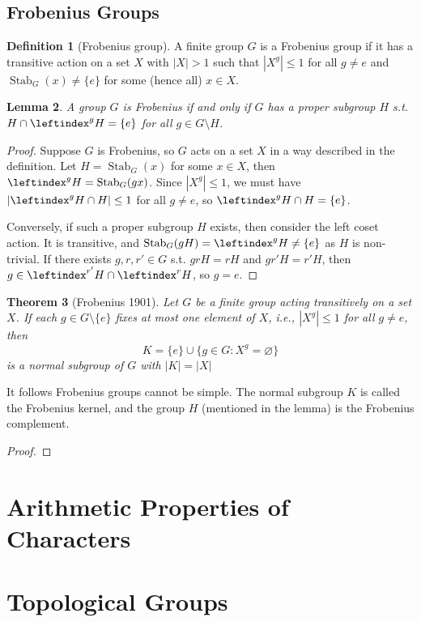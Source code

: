 \documentclass{article}
\theoremstyle{definition}
\newtheorem{defn}{Definition}[section]
\theoremstyle{remark}
\theoremstyle{plain}
\newtheorem{lem}[defn]{Lemma}
\newtheorem{thm}[defn]{Theorem}
\begin{document}
\subsection{Frobenius Groups}
\begin{defn}[Frobenius group]
    A finite group $G$ is a Frobenius group if it has a transitive action on a set $X$ with $|X|>1$ such that $|X^g|\le 1$ for all $g\neq e$ and $\operatorname{Stab}_G(x)\neq\{e\}$ for some (hence all) $x\in X$.
\end{defn}
\begin{lem}
    A group $G$ is Frobenius if and only if $G$ has a proper subgroup $H$ s.t. $H\cap\leftindex^gH=\{e\}$ for all $g\in G\setminus H$.
\end{lem}
\begin{proof}
    Suppose $G$ is Frobenius, so $G$ acts on a set $X$ in a way described in the definition. Let $H=\operatorname{Stab}_G(x)$ for some $x\in X$, then $\leftindex^gH=\operatorname{Stab}_G(gx)$. Since $|X^g|\le 1$, we must have $|\leftindex^gH\cap H|\le 1$ for all $g\neq e$, so $\leftindex^gH\cap H=\{e\}$.

    Conversely, if such a proper subgroup $H$ exists, then consider the left coset action. It is transitive, and $\operatorname{Stab}_G(gH)=\leftindex^gH\neq \{e\}$ as $H$ is non-trivial. If there exists $g,r,r'\in G$ s.t. $grH=rH$ and $gr'H=r'H$, then $g\in\leftindex^{r'}H\cap\leftindex^rH$, so $g=e$. 
\end{proof}
\begin{thm}[Frobenius 1901]
    Let $G$ be a finite group acting transitively on a set $X$. If each $g\in G\setminus\{e\}$ fixes at most one element of $X$, i.e., $|X^g|\le 1$ for all $g\neq e$, then
    \[K=\{e\}\cup\{g\in G:X^g=\varnothing\}\]
    is a normal subgroup of $G$ with $|K|=|X|$
\end{thm}
It follows Frobenius groups cannot be simple. The normal subgroup $K$ is called the Frobenius kernel, and the group $H$ (mentioned in the lemma) is the Frobenius complement.
\begin{proof}
    
\end{proof}

\section{Arithmetic Properties of Characters}
\section{Topological Groups}
\end{document}
